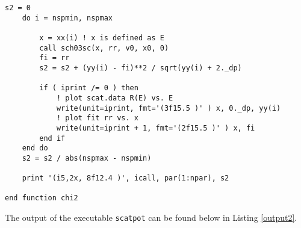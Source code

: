 \documentclass[12pt]{article}
\begin{document}
\begin{lstlisting}[frame=single,caption={{\tt elpot.f90}},label=scatpot2]
    s2 = 0
    do i = nspmin, nspmax
        
        x = xx(i) ! x is defined as E
        call sch03sc(x, rr, v0, x0, 0)
        fi = rr 
        s2 = s2 + (yy(i) - fi)**2 / sqrt(yy(i) + 2._dp)

        if ( iprint /= 0 ) then
            ! plot scat.data R(E) vs. E
            write(unit=iprint, fmt='(3f15.5 )' ) x, 0._dp, yy(i)
            ! plot fit rr vs. x
            write(unit=iprint + 1, fmt='(2f15.5 )' ) x, fi 
        end if
    end do 
    s2 = s2 / abs(nspmax - nspmin)

    print '(i5,2x, 8f12.4 )', icall, par(1:npar), s2

end function chi2

\end{lstlisting}

The output of the executable {\tt scatpot} can be found below in Listing \ref{output2}.
\end{document}
